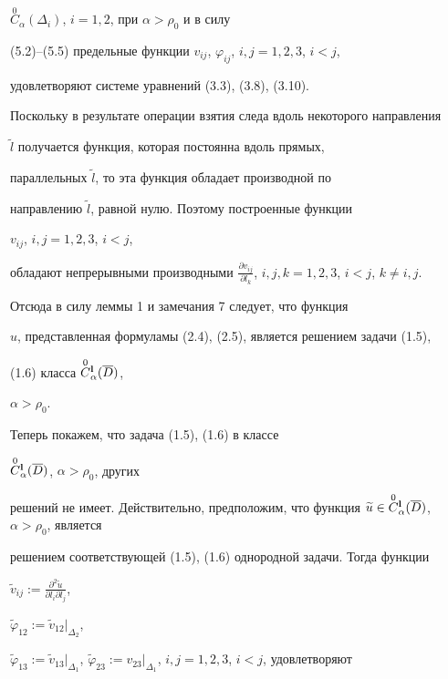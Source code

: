 $\overset{0}{C}_{\alpha}(\Delta_i)$, $i=1,2$, при $\alpha > \rho_0$ и в силу


(5.2)--(5.5) предельные функции $v_{ij}$, $\varphi_{ij}$, $i,j=1,2,3$, $i<j$,


удовлетворяют системе уравнений (3.3), (3.8), (3.10).





Поскольку в результате операции взятия следа вдоль некоторого направления


$\widetilde l$ получается функция, которая постоянна вдоль прямых,


параллельных $\widetilde l$, то эта функция обладает производной по


направлению $\widetilde l$, равной нулю. Поэтому построенные функции


$v_{ij}$, $i,j=1,2,3$, $i<j$,


обладают непрерывными производными $\frac{\partial


v_{ij}}{\partial l_k}$, $i,j,k=1,2,3$, $i<j$, $k\neq i,j$.


Отсюда в силу леммы 1 и замечания 7 следует, что функция


$u$, представленная формуламы (2.4), (2.5), является решением задачи (1.5),


(1.6) класса $\overset{0}{C}{}_{\alpha}^{\bold{l}}(\overline D)$,


$\alpha >\rho_0$.





Теперь покажем, что задача (1.5), (1.6) в классе


$\overset{0}{C}{}_{\alpha}^{\bold{l}}(\overline D)$, $\alpha>\rho_0$, других


решений не имеет. Действительно, предположим, что функция $\widetilde{u}\in


\overset{0}{C}{}_{\alpha}^{\bold{l}}(\overline D)$, $\alpha>\rho_0$, является


решением соответствующей (1.5), (1.6) однородной задачи. Тогда функции


$\widetilde v_{ij}:=\frac{\partial^2\widetilde u}{\partial l_i\partial l_j}$,


$\widetilde \varphi_{12}:=\widetilde v_{12}\big |_{\Delta_2}$,


$\widetilde \varphi_{13}:=\widetilde v_{13}\big |_{\Delta_1}$, $\widetilde


\varphi_{23}:= v_{23}\big |_{\Delta_1}$, $i,j=1,2,3$, $i<j$, удовлетворяют


